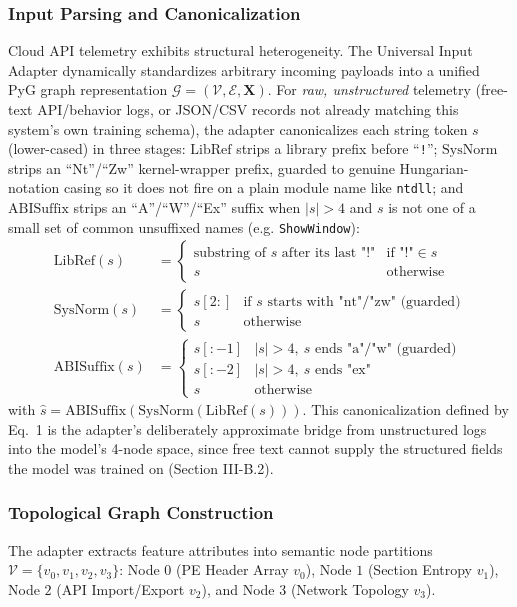 \documentclass[conference]{IEEEtran}
\begin{document}
\subsubsection{Input Parsing and Canonicalization}
Cloud API telemetry exhibits structural heterogeneity. The Universal Input Adapter dynamically standardizes arbitrary incoming payloads into a unified PyG graph representation $\mathcal{G} = (\mathcal{V}, \mathcal{E}, \mathbf{X})$. For \emph{raw, unstructured} telemetry (free-text API/behavior logs, or JSON/CSV records not already matching this system's own training schema), the adapter canonicalizes each string token $s$ (lower-cased) in three stages: $\text{LibRef}$ strips a library prefix before ``\texttt{!}''; $\text{SysNorm}$ strips an ``Nt''/``Zw'' kernel-wrapper prefix, guarded to genuine Hungarian-notation casing so it does not fire on a plain module name like \texttt{ntdll}; and $\text{ABISuffix}$ strips an ``A''/``W''/``Ex'' suffix when $|s|>4$ and $s$ is not one of a small set of common unsuffixed names (e.g. \texttt{ShowWindow}):
\begin{equation}
\begin{aligned}
\text{LibRef}(s) &= \begin{cases} \text{substring of } s \text{ after its last "!"} & \text{if "!"} \in s \\ s & \text{otherwise} \end{cases} \\
\text{SysNorm}(s) &= \begin{cases} s[2:] & \text{if } s \text{ starts with "nt"/"zw" (guarded)} \\ s & \text{otherwise} \end{cases} \\
\text{ABISuffix}(s) &= \begin{cases} s[:-1] & |s|{>}4,\ s \text{ ends "a"/"w" (guarded)} \\ s[:-2] & |s|{>}4,\ s \text{ ends "ex"} \\ s & \text{otherwise} \end{cases}
\end{aligned}
\end{equation}
with $\hat{s} = \text{ABISuffix}(\text{SysNorm}(\text{LibRef}(s)))$. This canonicalization defined by Eq.~1 is the adapter's deliberately approximate bridge from unstructured logs into the model's 4-node space, since free text cannot supply the structured fields the model was trained on (Section III-B.2).

\subsubsection{Topological Graph Construction}
The adapter extracts feature attributes into semantic node partitions $\mathcal{V} = \{v_0, v_1, v_2, v_3\}$: Node $0$ (PE Header Array $v_0$), Node $1$ (Section Entropy $v_1$), Node $2$ (API Import/Export $v_2$), and Node $3$ (Network Topology $v_3$).
\end{document}
